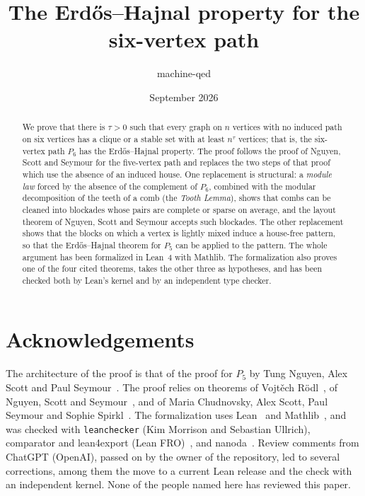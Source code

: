 \documentclass[11pt]{amsart}
\title{The Erd\H{o}s--Hajnal property for the six-vertex path}
\author[]{machine-qed}
\date{September 2026}
\theoremstyle{definition}
\theoremstyle{remark}
\newcommand{\lean}[1]{\texttt{#1}}
\begin{document}
\begin{abstract}
We prove that there is $\tau>0$ such that every graph on $n$ vertices with no induced path on six vertices
has a clique or a stable set with at least $n^{\tau}$ vertices; that is, the six-vertex path $P_6$ has
the Erd\H{o}s--Hajnal property. The proof follows the proof of Nguyen, Scott and Seymour for the
five-vertex path and replaces the two steps of that proof which use the absence of an induced house. One
replacement is structural: a \emph{module law} forced by the absence of the complement of $P_6$, combined
with the modular decomposition of the teeth of a comb (the \emph{Tooth Lemma}), shows that combs can be
cleaned into blockades whose pairs are complete or sparse on average, and the layout theorem of Nguyen,
Scott and Seymour accepts such blockades. The other replacement shows that the blocks on which a vertex
is lightly mixed induce a house-free pattern, so that the Erd\H{o}s--Hajnal theorem for $P_5$ can be
applied to the pattern. The whole argument has been formalized in Lean~4 with Mathlib. The formalization
also proves one of the four cited theorems, takes the other three as hypotheses, and has been checked
both by Lean's kernel and by an independent type checker.
\end{abstract}

\maketitle
\setcounter{tocdepth}{1}
\tableofcontents














\section*{Acknowledgements}
The architecture of the proof is that of the proof for $P_5$ by Tung Nguyen, Alex Scott and Paul
Seymour~\cite{NSS7}. The proof relies on theorems of Vojt\v{e}ch R\"odl~\cite{Rodl}, of Nguyen, Scott and
Seymour~\cite{NSS5,NSS7}, and of Maria Chudnovsky, Alex Scott, Paul Seymour and Sophie Spirkl~\cite{C5}.
The formalization uses Lean~\cite{lean4} and Mathlib~\cite{mathlib}, and was checked with
\lean{leanchecker} (Kim Morrison and Sebastian Ullrich), comparator and lean4export (Lean
FRO)~\cite{comparator}, and nanoda~\cite{nanoda}. Review comments from ChatGPT (OpenAI), passed on by the
owner of the repository, led to several corrections, among them the move to a current Lean release and
the check with an independent kernel. None of the people named here has reviewed this paper.
\end{document}
